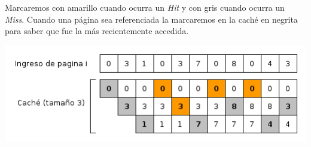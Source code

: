\documentclass[11pt, a4paper, spanish]{article}
\begin{document}
Marcaremos con amarillo cuando ocurra un \textit{Hit} y con gris cuando ocurra un \textit{Miss}.
Cuando una p\'agina sea referenciada la marcaremos en la cach\'e en negrita para saber que fue la m\'as recientemente accedida.\\

\begin{center}
		\includegraphics[scale=0.65]{diagramas/LRUAlgorithm.png}\\
\end{center}
\end{document}
